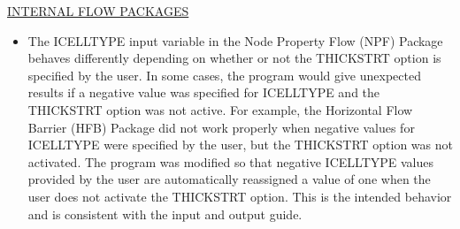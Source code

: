 	\underline{INTERNAL FLOW PACKAGES}
	\begin{itemize}
		\item The ICELLTYPE input variable in the Node Property Flow (NPF) Package behaves differently depending on whether or not the THICKSTRT option is specified by the user.  In some cases, the program would give unexpected results if a negative value was specified for ICELLTYPE and the THICKSTRT option was not active.  For example, the Horizontal Flow Barrier (HFB) Package did not work properly when negative values for ICELLTYPE were specified by the user, but the THICKSTRT option was not activated.  The program was modified so that negative ICELLTYPE values provided by the user are automatically reassigned a value of one when the user does not activate the THICKSTRT option.  This is the intended behavior and is consistent with the input and output guide.   
	\end{itemize}


